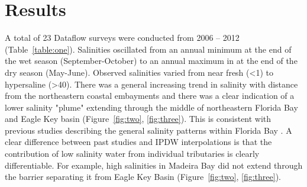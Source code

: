 \documentclass[shortnames,nofooter,noheadings]{jss}
\begin{document}
\section[Results]{Results}
\noindent A total of 23 Dataflow surveys were conducted from 2006 – 2012 (Table~\ref{table:one}). Salinities oscillated from an annual minimum at the end of the wet season (September-October) to an annual maximum in at the end of the dry season (May-June). Observed salinities varied from near fresh (<1) to hypersaline (>40). There was a general increasing trend in salinity with distance from the northeastern coastal embayments and there was a clear indication of a lower salinity "plume" extending through the middle of northeastern Florida Bay and Eagle Key basin (Figure~\ref{fig:two}, \ref{fig:three}). This is consistent with previous studies describing the general salinity patterns within Florida Bay \citep{kelble2007salinity}. A clear difference between past studies and IPDW interpolations is that the contribution of low salinity water from individual tributaries is clearly differentiable. For example, high salinities in Madeira Bay did not extend through the barrier separating it from Eagle Key Basin (Figure~\ref{fig:two}, \ref{fig:three}). 
\end{document}
